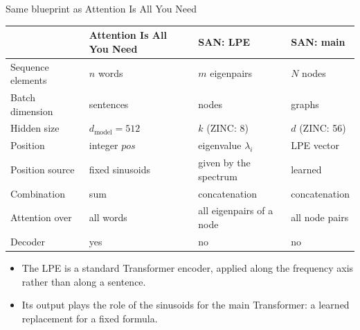 \documentclass[aspectratio=169,11pt]{beamer}
\begin{document}
\begin{frame}{Same blueprint as Attention Is All You Need}
  \centering
  \footnotesize
  \begin{tabular}{llll}
    \toprule
    & \textbf{Attention Is All You Need} & \textbf{SAN: LPE} & \textbf{SAN: main} \\
    \midrule
    Sequence elements & $n$ words & $m$ eigenpairs & $N$ nodes \\
    Batch dimension   & sentences & nodes & graphs \\
    Hidden size       & $d_{\text{model}} = 512$ & $k$ (ZINC: 8) & $d$ (ZINC: 56) \\
    Position          & integer $pos$ & eigenvalue $\lambda_i$ & LPE vector \\
    Position source   & fixed sinusoids & given by the spectrum & learned \\
    Combination       & sum & concatenation & concatenation \\
    Attention over    & all words & all eigenpairs of a node & all node pairs \\
    Decoder           & yes & no & no \\
    \bottomrule
  \end{tabular}

  \bigskip
  \normalsize
  \raggedright
  \begin{itemize}
    \item The LPE is a standard Transformer encoder, applied along the
          \alert{frequency axis} rather than along a sentence.
    \item Its output plays the role of the sinusoids for the main Transformer:
          a \alert{learned} replacement for a fixed formula.
  \end{itemize}
\end{frame}
\end{document}
